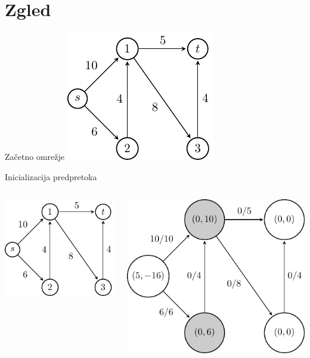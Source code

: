 \documentclass{beamer}
\begin{document}
\section{Zgled}
\begin{frame}{Začetno omrežje}
    \centering
    \includegraphics[scale=1.6]{../writing/images/graf2-1.pdf}
\end{frame}

\begin{frame}{Inicializacija predpretoka}
    \begin{columns}
        \begin{column}{0.5\textwidth}
            \centering
            \includegraphics[scale=1.2]{../writing/images/graf2-1.pdf}
        \end{column}

        \begin{column}{0.5\textwidth}
            \centering
            \includegraphics[scale=0.7]{../writing/images/graf2-2.pdf}
        \end{column}
    \end{columns}
\end{frame}
\end{document}
